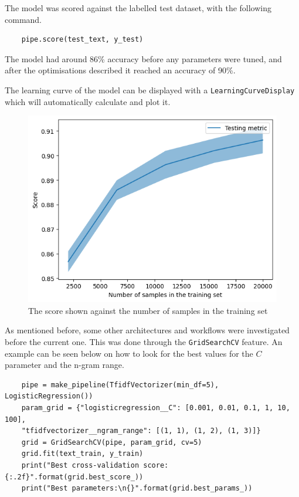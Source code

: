 \documentclass[a4paper,12pt]{article}
\begin{document}
The model was scored against the labelled test dataset, with the following
command.

\begin{verbatim}
    pipe.score(test_text, y_test)
\end{verbatim}

The model had around 86\% accuracy before any parameters were tuned, and after
the optimisations described it reached an accuracy of 90\%.

The learning curve of the model can be displayed with a
\texttt{LearningCurveDisplay} which will automatically calculate and plot it.

\begin{figure}[h]
    \centering
    \caption{The score shown against the number of samples in the training set}
    \includegraphics[scale=0.6]{images/loss.png}
\end{figure}

As mentioned before, some other architectures and workflows were investigated
before the current one. This was done through the \texttt{GridSearchCV} feature.
An example can be seen below on how to look for the best values for the \(C\)
parameter and the n-gram range.

\begin{verbatim}
    pipe = make_pipeline(TfidfVectorizer(min_df=5), LogisticRegression())
    param_grid = {"logisticregression__C": [0.001, 0.01, 0.1, 1, 10, 100],
    "tfidfvectorizer__ngram_range": [(1, 1), (1, 2), (1, 3)]}
    grid = GridSearchCV(pipe, param_grid, cv=5)
    grid.fit(text_train, y_train)
    print("Best cross-validation score: {:.2f}".format(grid.best_score_))
    print("Best parameters:\n{}".format(grid.best_params_))
\end{verbatim}
\end{document}
